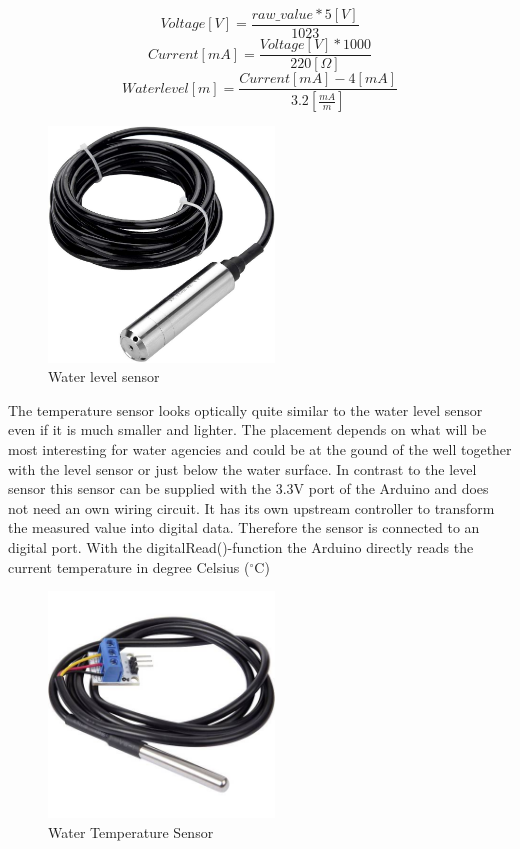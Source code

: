 \documentclass[11pt, letterpaper]{article}
\begin{document}
\begingroup
\Large
\begin{equation} 
Voltage [V]={\frac{raw\_value * 5 [V]}{1023}}
\end{equation}
\begin{equation} 
Current [mA]={\frac{Voltage [V] * 1000}{220 [\Omega]}}
\end{equation}
\begin{equation} 
Waterlevel [m]={\frac{Current [mA] - 4 [mA]}{3.2 [{\frac{mA}{m}}]}}
\end{equation}
\endgroup
\begin{figure}[ht!]
	\centering
	\includegraphics[width=60mm]{figures/water_lvl.jpg}
	\caption{Water level sensor \label{water_lvl}}
\end{figure}
\newline

The temperature sensor looks optically quite similar to the water level sensor even if it is much smaller and lighter. The placement depends on what will be most interesting for water agencies and could be at the gound of the well together with the level sensor or just below the water surface. In contrast to the level sensor this sensor can be supplied with the 3.3V port of the Arduino and does not need an own wiring circuit. It has its own upstream controller to transform the measured value into digital data. Therefore the sensor is connected to an digital port. With the digitalRead()-function the Arduino directly reads the current temperature in degree Celsius ($^{\circ}$C)
\begin{figure}[ht!]
	\centering
	\includegraphics[width=60mm]{figures/water_temp.jpg}
	\caption{Water Temperature Sensor \label{water_temp}}
\end{figure}
\newline
\end{document}
